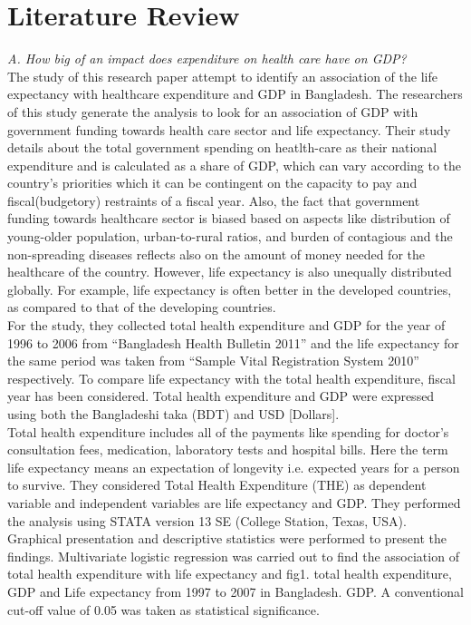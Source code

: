 \documentclass[conference]{IEEEtran}
\begin{document}
\section{Literature Review}
\emph{A. How big of an impact does expenditure on health care have on GDP?}
\\The study of this research paper attempt to identify an association of the life expectancy with healthcare expenditure and GDP in Bangladesh. The researchers of this study generate the analysis to look for an association of GDP with government funding towards health care sector and life expectancy.
Their study details about the total government spending on heatlth-care as their national expenditure and is calculated as a share of GDP, which can vary according to the country's priorities which it can be contingent on the capacity to pay and fiscal(budgetory) restraints of a fiscal year. Also, the fact that government funding towards healthcare sector is biased based on aspects like distribution of young-older population, urban-to-rural ratios, and burden of contagious and the non-spreading diseases reflects also on the amount of money needed for the healthcare of the country. However, life expectancy is also unequally distributed globally. For example, life expectancy is often better in the developed countries, as compared to that of the developing countries.
\\For the study, they collected total health expenditure and GDP for the year of 1996 to 2006 from “Bangladesh Health Bulletin 2011” and the life expectancy for the same period was taken from “Sample Vital Registration System 2010” respectively. To compare life expectancy with the total health expenditure, fiscal year has been considered. Total health expenditure and GDP were expressed using both the Bangladeshi taka (BDT) and USD [Dollars].
\\Total health expenditure includes all of the payments like spending for doctor's consultation fees, medication, laboratory tests and hospital bills. Here the term life expectancy means an expectation of longevity i.e. expected years for a person to survive. They considered Total Health Expenditure (THE) as dependent variable and independent variables are life expectancy and GDP. They performed the analysis using STATA version 13 SE (College Station, Texas, USA). Graphical presentation and descriptive statistics were performed to present the findings. Multivariate logistic regression was carried out to find the association of total health expenditure with life expectancy and fig1. total health expenditure, GDP and Life expectancy from 1997 to 2007 in Bangladesh. GDP. A conventional cut-off value of 0.05 was taken as statistical significance.
\end{document}
